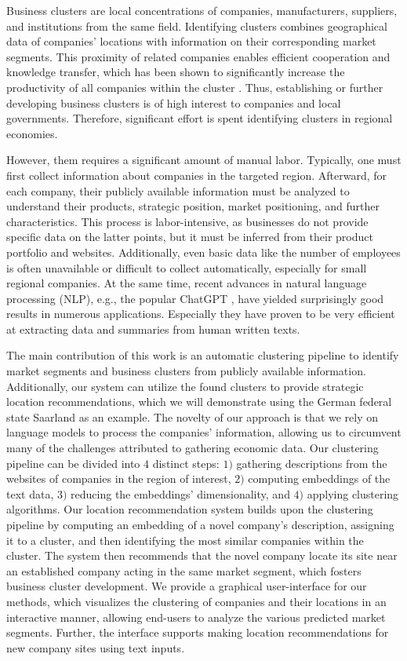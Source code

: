\documentclass[12pt]{article}
\begin{document}
   Business clusters are local concentrations of companies, manufacturers, suppliers, and institutions from the same field. Identifying clusters combines geographical data of companies' locations with information on their corresponding market segments. This proximity of related companies enables efficient cooperation and knowledge transfer, which has been shown to significantly increase the productivity of all companies within the cluster \cite{clustersandcomp,gems-model, regionaladv, clustertheory}. Thus, establishing or further developing business clusters is of high interest to companies and local governments. Therefore, significant effort is spent identifying clusters in regional economies. 
   
   However, them requires a significant amount of manual labor. Typically, one must first collect information about companies in the targeted region. Afterward, for each company, their publicly available information must be analyzed to understand their products, strategic position, market positioning, and further characteristics. 
   This process is labor-intensive, as businesses do not provide specific data on the latter points, but it must be inferred from their product portfolio and websites. Additionally, even basic data like the number of employees is often unavailable or difficult to collect automatically, especially for small regional companies.
   At the same time, recent advances in natural language processing (NLP), e.g., the popular ChatGPT \cite{chatgpt}, have yielded surprisingly good results in numerous applications. Especially they have proven to be very efficient at extracting data and summaries from human written texts.
   
   The main contribution of this work is an automatic clustering pipeline to identify market segments and business clusters from publicly available information. Additionally, our system can utilize the found clusters to provide strategic location recommendations, which we will demonstrate using the German federal state Saarland as an example. The novelty of our approach is that we rely on language models to process the companies' information, allowing us to circumvent many of the challenges attributed to gathering economic data. 
   Our clustering pipeline can be divided into $4$ distinct steps: $1)$ gathering descriptions from the websites of companies in the region of interest, $2)$ computing embeddings of the text data, $3)$ reducing the embeddings' dimensionality, and $4)$ applying clustering algorithms.
   Our location recommendation system builds upon the clustering pipeline by computing an embedding of a novel company's description, assigning it to a cluster, and then identifying the most similar companies within the cluster. The system then recommends that the novel company locate its site near an established company acting in the same market segment, which fosters business cluster development.
   We provide a graphical user-interface for our methods, which visualizes the clustering of companies and their locations in an interactive manner, allowing end-users to analyze the various predicted market segments. Further, the interface supports making location recommendations for new company sites using text inputs.
   
\end{document}
